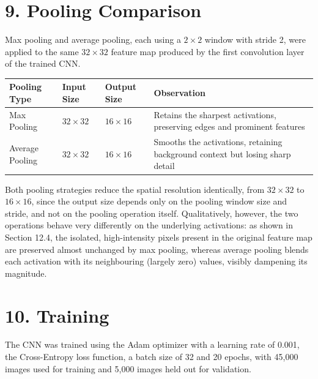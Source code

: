 \documentclass[11pt,a4paper]{article}
\begin{document}
\section*{9. Pooling Comparison}

Max pooling and average pooling, each using a $2\times2$ window with stride 2, were applied to the same $32\times32$ feature map produced by the first convolution layer of the trained CNN.

\begin{center}
\begin{tabular}{|p{3.5cm}|p{2.5cm}|p{2.5cm}|p{6cm}|}
\hline
\textbf{Pooling Type} & \textbf{Input Size} & \textbf{Output Size} & \textbf{Observation}\\
\hline
Max Pooling & $32\times32$ & $16\times16$ & Retains the sharpest activations, preserving edges and prominent features\\
\hline
Average Pooling & $32\times32$ & $16\times16$ & Smooths the activations, retaining background context but losing sharp detail\\
\hline
\end{tabular}
\end{center}

\vspace{0.15cm}

Both pooling strategies reduce the spatial resolution identically, from $32\times32$ to $16\times16$, since the output size depends only on the pooling window size and stride, and not on the pooling operation itself. Qualitatively, however, the two operations behave very differently on the underlying activations: as shown in Section 12.4, the isolated, high-intensity pixels present in the original feature map are preserved almost unchanged by max pooling, whereas average pooling blends each activation with its neighbouring (largely zero) values, visibly dampening its magnitude.
\newpage
\section*{10. Training}

The CNN was trained using the Adam optimizer with a learning rate of 0.001, the Cross-Entropy loss function, a batch size of 32 and 20 epochs, with 45{,}000 images used for training and 5{,}000 images held out for validation.
\end{document}
